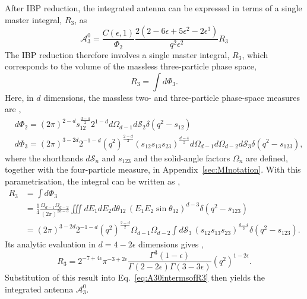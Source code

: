 After IBP reduction, the integrated antenna can be expressed in terms of a single master integral, $R_3$, as
\begin{equation}\label{eq:A30intermsofR3}
    \mathcal A_3^0 = \frac{C(\epsilon,1)}{\Phi_2}\frac{2(2-6\epsilon+5\epsilon^2-2\epsilon^3)}{q^2\epsilon^2}R_3
\end{equation}
The IBP reduction therefore involves a single master integral, $R_3$, which corresponds to the volume
of the massless three-particle phase space,
\begin{equation}
    R_3 = \int d\Phi_3.
\end{equation}
Here, in $d$ dimensions, the massless two- and three-particle phase-space measures are
\cite{GehrmannDeRidder0311276,Anastasiou:2002yz},
\begin{equation}
    \begin{split}
        &d\Phi_2 = (2\pi)^{2-d}s_{12}^{\frac{d-4}{2}}2^{1-d}d\Omega_{d-1}d\mathcal S_2\delta\!\left(q^2-s_{12}\right)\\
        &d\Phi_3 = (2\pi)^{3-2d}2^{-1-d}\!\left(q^2\right)^{\frac{2-d}{2}}(s_{12}s_{13}s_{23})^{\frac{d-4}{2}}d\Omega_{d-1}d\Omega_{d-2}d\mathcal S_3\delta\!\left(q^2-s_{123}\right),
    \end{split}
\end{equation}
where the shorthands $d\mathcal S_n$ and $s_{123}$ and the solid-angle factors $\Omega_n$ are defined, together
with the four-particle measure, in Appendix~\ref{sec:MInotation}. With this parametrisation, the integral
can be written as \cite{TM_JoanaReis},
\begin{equation}
    \begin{split}
        R_3 &= \int d\Phi_3\\
            &= \frac14\frac{\Omega_{d-1}\Omega_{d-2}}{(2\pi)^{2d-3}}\iiint dE_1dE_2d\theta_{12}\,(E_1E_2\sin\theta_{12})^{d-3}\delta\!\left(q^2-s_{123}\right)\\
            &= (2\pi)^{3-2d}2^{-1-d}\left(q^2\right)^{\frac{2-d}{2}}\Omega_{d-1}\Omega_{d-2}\int d\mathcal S_3\,(s_{12}s_{13}s_{23})^{\frac{d-4}{2}}\delta\!\left(q^2-s_{123}\right).
    \end{split}
\end{equation}
Its analytic evaluation in $d=4-2\epsilon$ dimensions gives \cite{GehrmannDeRidder0311276},
\begin{equation}\label{eq:R3}
    R_3 = 2^{-7+4\epsilon}\pi^{-3+2\epsilon}\frac{\Gamma^3(1-\epsilon)}{\Gamma(2-2\epsilon)\Gamma(3-3\epsilon)}\!\left(q^2\right)^{1-2\epsilon}.
\end{equation}
Substitution of this result into Eq.~\eqref{eq:A30intermsofR3} then yields the integrated antenna
$\mathcal A_3^0$.

